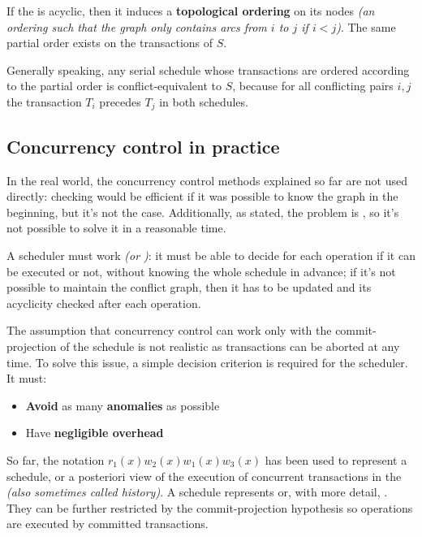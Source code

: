 \documentclass[english]{article}
\begin{document}
If the \cg is acyclic, then it induces a \textbf{topological ordering} on its nodes \textit{(an ordering such that the graph only contains arcs from \(i\) to \(j\) if \(i < j\))}.
The same partial order exists on the transactions of \(S\).

Generally speaking, any serial schedule whose transactions are ordered according to the partial order is conflict-equivalent to \(S\), because for all conflicting pairs \(i, j\) the transaction \(T_i\) precedes \(T_j\) in both schedules.

\subsection{Concurrency control in practice}

In the real world, the concurrency control methods explained so far are not used directly: \csr checking would be efficient if it was possible to know the graph in the beginning, but it's not the case.
Additionally, as stated, the problem is \NPC, so it's not possible to solve it in a reasonable time.

A scheduler must work  \textit{(or )}: it must be able to decide for each operation if it can be executed or not, without knowing the whole schedule in advance;
if it's not possible to maintain the conflict graph, then it has to be updated and its acyclicity checked after each operation.

The assumption that concurrency control can work only with the commit-projection of the schedule is not realistic as transactions can be aborted at any time.
To solve this issue, a simple decision criterion is required for the scheduler.
It must:

\begin{itemize}
  \item \textbf{Avoid} as many \textbf{anomalies} as possible
  \item Have \textbf{negligible overhead}
\end{itemize}

So far, the notation \(r_1(x) w_2(x) w_1(x) w_3(x)\) has been used to represent a schedule, or a posteriori view of the execution of concurrent transactions in the \dbms \textit{(also sometimes called history)}.
A schedule represents  or, with more detail, .
They can be further restricted by the commit-projection hypothesis so operations are executed by committed transactions.
\end{document}
